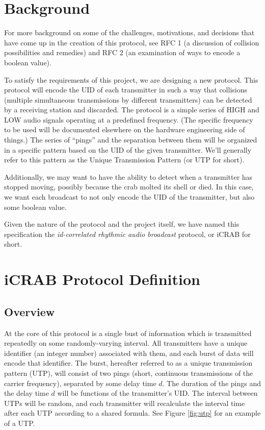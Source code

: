 \documentclass[12pt]{article}
\begin{document}
\section{Background} \label{background}

For more background on some of the challenges, motivations, and decisions
that have come up in the creation of this protocol, see
RFC 1 (a discussion of collision possibilities and remedies) and
RFC 2 (an examination of ways to encode a boolean value).

To satisfy the requirements of this project, we are designing a new protocol.
This protocol will encode the UID of each transmitter in such a way that
collisions (multiple simultaneous transmissions by different transmitters) can
be detected by a receiving station and discarded.
The protocol is a simple
series of HIGH and LOW audio signals operating at a predefined
frequency. (The specific frequency to be used will be documented elsewhere
on the hardware engineering side of things.)
The series of ``pings'' and the separation between them will be organized in a
specific pattern based on the UID of the given transmitter.
We'll generally refer to this pattern as the
Unique Transmission Pattern (or UTP for short).

Additionally, we may want to have the ability to detect when a transmitter
has stopped moving, possibly because the crab molted its shell or died.
In this case, we want each broadcast to not only encode the UID of the
transmitter, but also some boolean value.

Given the nature of the protocol and the project itself, we have named
this specification
the {\em id-correlated rhythmic audio broadcast} protocol,
or iCRAB for short.

\section{iCRAB Protocol Definition} \label{protocol-def}

\subsection{Overview}

At the core of this protocol is a single bust of information which is
transmitted repeatedly on some randomly-varying interval.
All transmitters have a unique identifier (an integer number) associated with
them, and each burst of data will encode that identifier.
The burst, hereafter referred to as a
unique transmission pattern (UTP), will consist of two pings (short, continuous
transmissions of the carrier frequency), separated by some delay time $d$.
The duration of the pings and the delay time $d$ will be functions of the
transmitter's UID.
The interval between UTPs will be random, and each transmitter will recalculate
the interval time after each UTP according to a shared formula.
See Figure \ref{fig:utp} for an example of a UTP.
\end{document}
